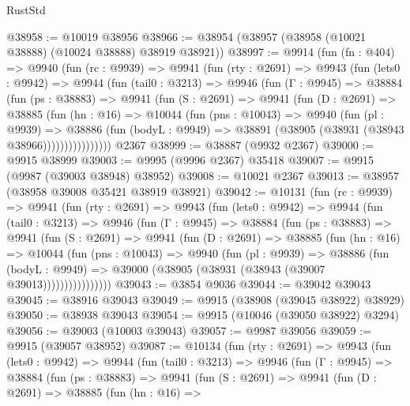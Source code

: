\begin{lexlean}{RustStd}
\begin{coremodule}
@38958 := @10019 @38956
@38966 := @38954 (@38957 (@38958 (@10021 @38888) (@10024 @38888) @38919 @38921))
@38997 := @9914
    (fun (fn : @404) =>
    @9940
      (fun (rc : @9939) =>
      @9941
        (fun (rty : @2691) =>
        @9943
          (fun (lets0 : @9942) =>
          @9944
            (fun (tail0 : @3213) =>
            @9946
              (fun (Γ : @9945) =>
              @38884
                (fun (ps : @38883) =>
                @9941
                  (fun (S : @2691) =>
                  @9941
                    (fun (D : @2691) =>
                    @38885
                      (fun (hn : @16) =>
                      @10044
                        (fun (pns : @10043) =>
                        @9940
                          (fun (pl : @9939) =>
                          @38886
                            (fun (bodyL : @9949) =>
                            @38891 (@38905 (@38931 (@38943 @38966))))))))))))))))
    @2367
@38999 := @38887 (@9932 @2367)
@39000 := @9915 @38999
@39003 := @9995 (@9996 @2367) @35418
@39007 := @9915 (@9987 (@39003 @38948) @38952)
@39008 := @10021 @2367
@39013 := @38957 (@38958 @39008 @35421 @38919 @38921)
@39042 := @10131
    (fun (rc : @9939) =>
    @9941
      (fun (rty : @2691) =>
      @9943
        (fun (lets0 : @9942) =>
        @9944
          (fun (tail0 : @3213) =>
          @9946
            (fun (Γ : @9945) =>
            @38884
              (fun (ps : @38883) =>
              @9941
                (fun (S : @2691) =>
                @9941
                  (fun (D : @2691) =>
                  @38885
                    (fun (hn : @16) =>
                    @10044
                      (fun (pns : @10043) =>
                      @9940
                        (fun (pl : @9939) =>
                        @38886
                          (fun (bodyL : @9949) =>
                          @39000 (@38905 (@38931 (@38943 (@39007 @39013))))))))))))))))
@39043 := @3854 @9036
@39044 := @39042 @39043
@39045 := @38916 @39043
@39049 := @9915 (@38908 (@39045 @38922) @38929)
@39050 := @38938 @39043
@39054 := @9915 (@10046 (@39050 @38922) @3294)
@39056 := @39003 (@10003 @39043)
@39057 := @9987 @39056
@39059 := @9915 (@39057 @38952)
@39087 := @10134
    (fun (rty : @2691) =>
    @9943
      (fun (lets0 : @9942) =>
      @9944
        (fun (tail0 : @3213) =>
        @9946
          (fun (Γ : @9945) =>
          @38884
            (fun (ps : @38883) =>
            @9941
              (fun (S : @2691) =>
              @9941
                (fun (D : @2691) =>
                @38885
                  (fun (hn : @16) =>

\end{coremodule}
\end{lexlean}
